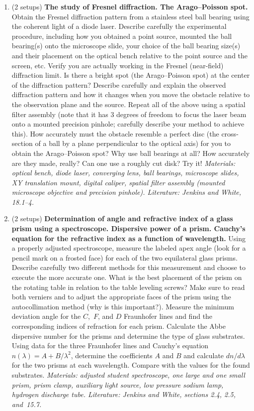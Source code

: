 \documentclass[12pt]{article}
\begin{document}
\begin{enumerate}
    \item (2 setups) \textbf{The study of Fresnel diffraction. The Arago--Poisson spot.} Obtain the Fresnel diffraction pattern from a stainless steel ball bearing using the coherent light of a diode laser. Describe carefully the experimental procedure, including how you obtained a point source, mounted the ball bearing(s) onto the microscope slide, your choice of the ball bearing size(s) and their placement on the optical bench relative to the point source and the screen, etc. Verify you are actually working in the Fresnel (near-field) diffraction limit. Is there a bright spot (the Arago--Poisson spot) at the center of the diffraction pattern? Describe carefully and explain the observed diffraction pattern and how it changes when you move the obstacle relative to the observation plane and the source. Repeat all of the above using a spatial filter assembly (note that it has 3 degrees of freedom to focus the laser beam onto a mounted precision pinhole; carefully describe your method to achieve this). How accurately must the obstacle resemble a perfect disc (the cross-section of a ball by a plane perpendicular to the optical axis) for you to obtain the Arago--Poisson spot? Why use ball bearings at all? How accurately are they made, really? Can one use a roughly cut disk? Try it! \textit{Materials: optical bench, diode laser, converging lens, ball bearings, microscope slides, XY translation mount, digital caliper, spatial filter assembly (mounted microscope objective and precision pinhole). Literature: Jenkins and White, 18.1--4.}
    \item (2 setups) \textbf{Determination of angle and refractive index of a glass prism using a spectroscope.  Dispersive power of a prism. Cauchy's equation for the refractive index as a function of wavelength.} Using a properly adjusted spectroscope, measure the labeled apex angle (look for a pencil mark on a frosted face) for each of the two equilateral glass prisms. Describe carefully two different methods for this measurement and choose to execute the more accurate one. What is the best placement of the prism on the rotating table in relation to the table leveling screws? Make sure to read both verniers and to adjust the appropriate faces of the prism using the autocollimation method (why is this important?). Measure the minimum deviation angle for the $C$,~$F$, and $D$ Fraunhofer lines and find the corresponding indices of refraction for each prism. Calculate the Abbe dispersive number for the prisms and determine the type of glass substrates. Using data for the three Fraunhofer lines and Cauchy's equation $n(\lambda) = A + B/\lambda^2$, determine the coefficients $A$ and $B$ and calculate $dn/d\lambda$ for the two prisms at each wavelength. Compare with the values for the found substrates. \textit{Materials: adjusted student spectroscope, one large and one small prism, prism clamp, auxiliary light source, low pressure sodium lamp, hydrogen discharge tube. Literature: Jenkins and White, sections 2.4, 2.5, and~15.7.}

\end{enumerate}
\end{document}
